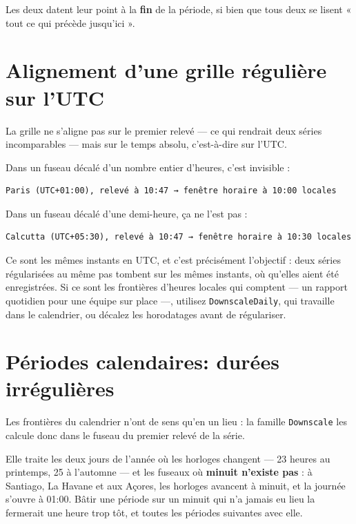 \documentclass[11pt,a4paper]{report}
\begin{document}
Les deux datent leur point à la \textbf{fin} de la période, si bien que
tous deux se lisent « tout ce qui précède jusqu'ici ».

\section{Alignement d'une grille régulière sur l'UTC}\label{sec:utc}

La grille ne s'aligne pas sur le premier relevé --- ce qui rendrait deux
séries incomparables --- mais sur le temps absolu, c'est-à-dire sur
l'UTC.

Dans un fuseau décalé d'un nombre entier d'heures, c'est invisible :

\begin{verbatim}
Paris (UTC+01:00), relevé à 10:47 → fenêtre horaire à 10:00 locales
\end{verbatim}

Dans un fuseau décalé d'une demi-heure, ça ne l'est pas :

\begin{verbatim}
Calcutta (UTC+05:30), relevé à 10:47 → fenêtre horaire à 10:30 locales
\end{verbatim}

Ce sont les mêmes instants en UTC, et c'est précisément l'objectif :
deux séries régularisées au même pas tombent sur les mêmes instants, où
qu'elles aient été enregistrées. Si ce sont les frontières d'heures
locales qui comptent --- un rapport quotidien pour une équipe sur place
---, utilisez \texttt{DownscaleDaily}, qui travaille dans le calendrier,
ou décalez les horodatages avant de régulariser.

\section{Périodes calendaires: durées irrégulières}

Les frontières du calendrier n'ont de sens qu'en un lieu : la famille
\texttt{Downscale} les calcule donc dans le fuseau du premier relevé de
la série.

Elle traite les deux jours de l'année où les horloges changent --- 23
heures au printemps, 25 à l'automne --- et les fuseaux où \textbf{minuit
n'existe pas} : à Santiago, La Havane et aux Açores, les horloges
avancent à minuit, et la journée s'ouvre à 01:00. Bâtir une période sur
un minuit qui n'a jamais eu lieu la fermerait une heure trop tôt, et
toutes les périodes suivantes avec elle.
\end{document}
